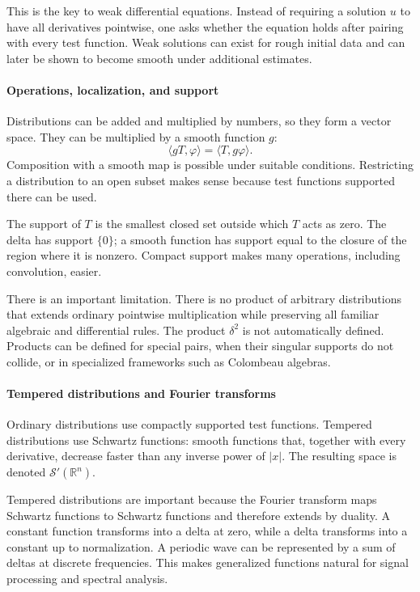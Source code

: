 This is the key to weak differential equations. Instead of requiring a solution $u$ to have all derivatives pointwise, one asks whether the equation holds after pairing with every test function. Weak solutions can exist for rough initial data and can later be shown to become smooth under additional estimates. \cite{distribution_theory_ref2,distribution_theory_ref6}

\paragraph{Operations, localization, and support}

Distributions can be added and multiplied by numbers, so they form a vector space. They can be multiplied by a smooth function $g$:
\[
 \langle gT,\varphi\rangle=\langle T,g\varphi\rangle.
\]
Composition with a smooth map is possible under suitable conditions. Restricting a distribution to an open subset makes sense because test functions supported there can be used.

The support of $T$ is the smallest closed set outside which $T$ acts as zero. The delta has support $\{0\}$; a smooth function has support equal to the closure of the region where it is nonzero. Compact support makes many operations, including convolution, easier.

There is an important limitation. There is no product of arbitrary distributions that extends ordinary pointwise multiplication while preserving all familiar algebraic and differential rules. The product $\delta^2$ is not automatically defined. Products can be defined for special pairs, when their singular supports do not collide, or in specialized frameworks such as Colombeau algebras. \cite{distribution_theory_ref1,distribution_theory_ref7}

\paragraph{Tempered distributions and Fourier transforms}

Ordinary distributions use compactly supported test functions. Tempered distributions use Schwartz functions: smooth functions that, together with every derivative, decrease faster than any inverse power of $|x|$. The resulting space is denoted $\mathcal S'(\mathbb R^n)$.

Tempered distributions are important because the Fourier transform maps Schwartz functions to Schwartz functions and therefore extends by duality. A constant function transforms into a delta at zero, while a delta transforms into a constant up to normalization. A periodic wave can be represented by a sum of deltas at discrete frequencies. This makes generalized functions natural for signal processing and spectral analysis.


